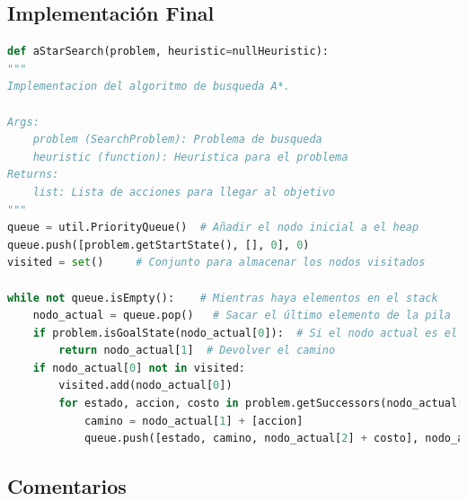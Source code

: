 \documentclass{report}
\begin{document}
        \subsection*{Implementación Final}
          \begin{lstlisting}[language=Python, caption=Implementación final del A*]
def aStarSearch(problem, heuristic=nullHeuristic):
"""
Implementacion del algoritmo de busqueda A*.

Args:
    problem (SearchProblem): Problema de busqueda
    heuristic (function): Heuristica para el problema
Returns:
    list: Lista de acciones para llegar al objetivo
"""
queue = util.PriorityQueue()  # Añadir el nodo inicial a el heap
queue.push([problem.getStartState(), [], 0], 0)
visited = set()     # Conjunto para almacenar los nodos visitados

while not queue.isEmpty():    # Mientras haya elementos en el stack
    nodo_actual = queue.pop()   # Sacar el último elemento de la pila
    if problem.isGoalState(nodo_actual[0]):  # Si el nodo actual es el objetivo
        return nodo_actual[1]  # Devolver el camino
    if nodo_actual[0] not in visited:
        visited.add(nodo_actual[0])
        for estado, accion, costo in problem.getSuccessors(nodo_actual[0]): # Añadir los hijos del nodo actual a la pila
            camino = nodo_actual[1] + [accion]
            queue.push([estado, camino, nodo_actual[2] + costo], nodo_actual[2] + costo + heuristic(estado, problem))        
          \end{lstlisting}
        \subsection*{Comentarios}
          \paragraph*{}{
          }
\end{document}
